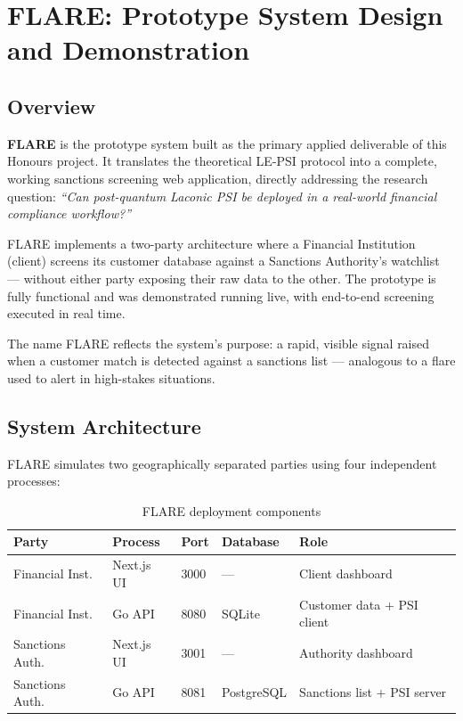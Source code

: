 \chapter{FLARE: Prototype System Design and Demonstration}

\section{Overview}

\textbf{FLARE} is the prototype system built as the primary applied deliverable of
this Honours project. It translates the theoretical LE-PSI protocol into a complete,
working sanctions screening web application, directly addressing the research question:
\textit{``Can post-quantum Laconic PSI be deployed in a real-world financial
compliance workflow?''}

FLARE implements a two-party architecture where a Financial Institution (client)
screens its customer database against a Sanctions Authority's watchlist --- without
either party exposing their raw data to the other. The prototype is fully functional
and was demonstrated running live, with end-to-end screening executed in real time.

The name FLARE reflects the system's purpose: a rapid, visible signal raised when a
customer match is detected against a sanctions list --- analogous to a flare used to
alert in high-stakes situations.

\section{System Architecture}

FLARE simulates two geographically separated parties using four independent processes:

\begin{table}[H]
\centering
\caption{FLARE deployment components}
\label{tab:flare-arch}
\begin{tabular}{@{}lllll@{}}
\toprule
\textbf{Party} & \textbf{Process} & \textbf{Port} & \textbf{Database} & \textbf{Role} \\
\midrule
Financial Inst. & Next.js UI   & 3000 & ---      & Client dashboard \\
Financial Inst. & Go API       & 8080 & SQLite   & Customer data + PSI client \\
Sanctions Auth. & Next.js UI   & 3001 & ---      & Authority dashboard \\
Sanctions Auth. & Go API       & 8081 & PostgreSQL & Sanctions list + PSI server \\
\bottomrule
\end{tabular}
\end{table}

